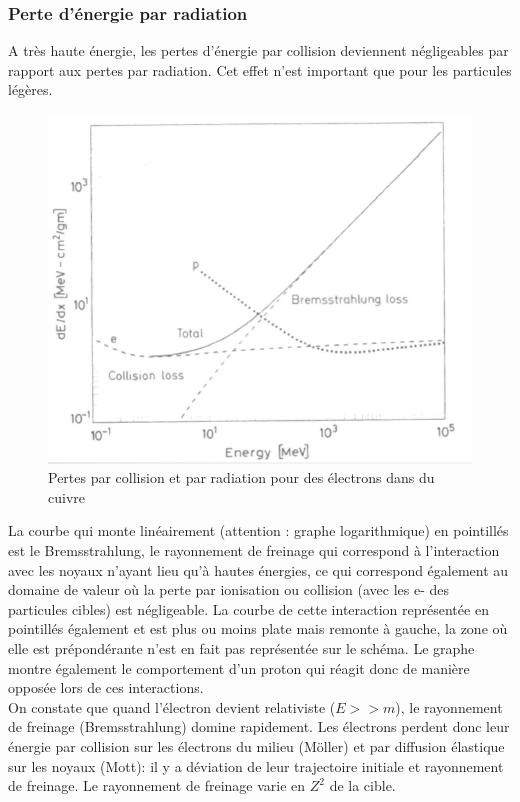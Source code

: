     
    \subsubsection{Perte d'énergie par radiation}
    
    A très haute énergie, les pertes d'énergie par collision deviennent négligeables par rapport aux pertes par radiation. Cet effet n'est important que pour les particules légères. 
    
    \begin{figure}[ht]
        \centering
        \includegraphics[scale=0.40]{Images1/bremstrucmachin.png}
        \caption{Pertes par collision et par radiation pour des électrons dans du cuivre}
    \end{figure}
    La courbe qui monte linéairement (attention : graphe logarithmique) en pointillés est le Bremsstrahlung, le rayonnement de freinage qui correspond à l'interaction avec les noyaux n'ayant lieu qu'à hautes énergies, ce qui correspond également au domaine de valeur où la perte par ionisation ou collision (avec les e- des particules cibles) est négligeable. La courbe de cette interaction représentée en pointillés également et est plus ou moins plate mais remonte à gauche, la zone où elle est prépondérante n'est en fait pas représentée sur le schéma. Le graphe montre également le comportement d'un proton qui réagit donc de manière opposée lors de ces interactions.\\
    On constate que quand l'électron devient relativiste ($E>>m$), le rayonnement de freinage (Bremsstrahlung) domine rapidement. Les électrons perdent donc leur énergie par collision sur les électrons du milieu (Möller) et par diffusion élastique sur les noyaux (Mott): il y a déviation de leur trajectoire initiale et rayonnement de freinage. Le rayonnement de freinage varie en $Z^2$ de la cible. 
    
